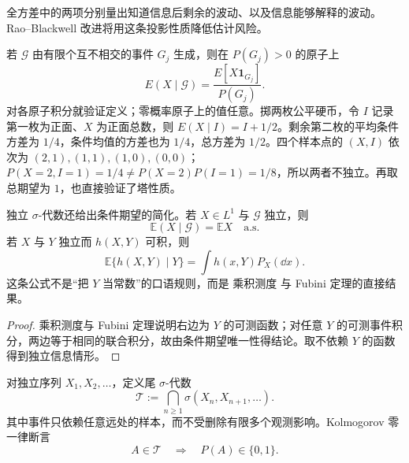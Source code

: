 全方差中的两项分别量出知道信息后剩余的波动、以及信息能够解释的波动。Rao--Blackwell 改进将用这条投影性质降低估计风险。

\begin{workedexample}[有限信息域上的条件平均]
若 $\mathcal G$ 由有限个互不相交的事件 $G_j$ 生成，则在 $P(G_j)>0$ 的原子上
\[
 E(X\mid\mathcal G)=\frac{E[X\mathbf1_{G_j}]}{P(G_j)}.
\]
对各原子积分就验证定义；零概率原子上的值任意。掷两枚公平硬币，令 $I$ 记录第一枚为正面、$X$ 为正面总数，则 $E(X\mid I)=I+1/2$。剩余第二枚的平均条件方差为 $1/4$，条件均值的方差也为 $1/4$，总方差为 $1/2$。四个样本点的 $(X,I)$ 依次为 $(2,1),(1,1),(1,0),(0,0)$；$P(X=2,I=1)=1/4\ne P(X=2)P(I=1)=1/8$，所以两者不独立。再取总期望为 $1$，也直接验证了塔性质。
\end{workedexample}

\begin{proposition}[独立信息下的条件平均]
独立 $\sigma$-代数还给出条件期望的简化。若 $X\in L^1$ 与 $\mathcal G$ 独立，则
\begin{equation*}\mathbb E(X\mid\mathcal G)=\mathbb E X
\quad\text{a.s.}\end{equation*}
若 $X$ 与 $Y$ 独立而 $h(X,Y)$ 可积，则
\[
\mathbb E\{h(X,Y)\mid Y\}
=\int h(x,Y)P_X(\dd x).
\]
这条公式不是“把 $Y$ 当常数”的口语规则，而是 乘积测度 与 Fubini 定理的直接结果。

\end{proposition}
\begin{proof}
乘积测度与 Fubini 定理说明右边为 $Y$ 的可测函数；对任意 $Y$ 的可测事件积分，两边等于相同的联合积分，故由条件期望唯一性得结论。取不依赖 $Y$ 的函数得到独立信息情形。
\end{proof}

\begin{theorem}
对独立序列 $X_1,X_2,\ldots$，定义尾 $\sigma$-代数
\[
\mathcal T
:=\bigcap_{n\ge1}\sigma(X_n,X_{n+1},\ldots).
\]
其中事件只依赖任意远处的样本，而不受删除有限多个观测影响。Kolmogorov 零一律断言
\begin{equation*}A\in\mathcal T
\quad\Longrightarrow\quad
P(A)\in\{0,1\}.\end{equation*}

\end{theorem}

